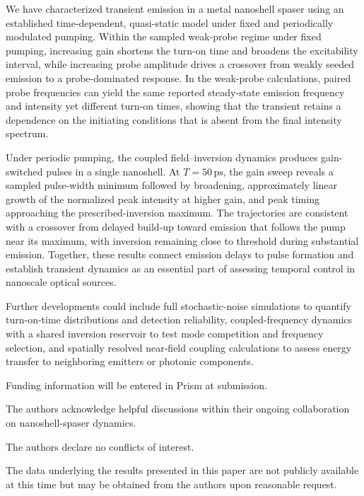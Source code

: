 \documentclass{optica-article}
\begin{document}
We have characterized transient emission in a metal nanoshell spaser using an established time-dependent, quasi-static model under fixed and periodically modulated pumping. Within the sampled weak-probe regime under fixed pumping, increasing gain shortens the turn-on time and broadens the excitability interval, while increasing probe amplitude drives a crossover from weakly seeded emission to a probe-dominated response. In the weak-probe calculations, paired probe frequencies can yield the same reported steady-state emission frequency and intensity yet different turn-on times, showing that the transient retains a dependence on the initiating conditions that is absent from the final intensity spectrum.

Under periodic pumping, the coupled field--inversion dynamics produces gain-switched pulses in a single nanoshell. At $T=50\,\mathrm{ps}$, the gain sweep reveals a sampled pulse-width minimum followed by broadening, approximately linear growth of the normalized peak intensity at higher gain, and peak timing approaching the prescribed-inversion maximum. The trajectories are consistent with a crossover from delayed build-up toward emission that follows the pump near its maximum, with inversion remaining close to threshold during substantial emission. Together, these results connect emission delays to pulse formation and establish transient dynamics as an essential part of assessing temporal control in nanoscale optical sources.

Further developments could include full stochastic-noise simulations to quantify turn-on-time distributions and detection reliability, coupled-frequency dynamics with a shared inversion reservoir to test mode competition and frequency selection, and spatially resolved near-field coupling calculations to assess energy transfer to neighboring emitters or photonic components.

\begin{backmatter}
Funding information will be entered in Prism at submission.

The authors acknowledge helpful discussions within their ongoing collaboration on nanoshell-spaser dynamics.

The authors declare no conflicts of interest.

The data underlying the results presented in this paper are not publicly available at this time but may be obtained from the authors upon reasonable request.
\end{backmatter}


\end{document}
